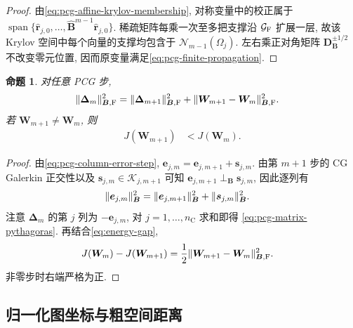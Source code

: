 \documentclass{ctexart}
\DeclarePairedDelimiter\norm{\lVert}{\rVert}
\newtheorem{proposition}[theorem]{命题}
\begin{document}
\begin{proof}
由\cref{eq:pcg-affine-krylov-membership}, 对称变量中的校正属于
$\operatorname{span}\{\widehat{\bm r}_{j,0},\ldots,
\widehat{\bm B}^{m-1}\widehat{\bm r}_{j,0}\}$.
稀疏矩阵每乘一次至多把支撑沿 $\mathcal G_{\rm F}$ 扩展一层, 故该 Krylov 空间中每个向量的支撑均包含于
$\mathcal N_{m-1}(\Omega_j)$. 左右乘正对角矩阵
$\bm D_{\bm B}^{\pm1/2}$ 不改变零元位置, 因而原变量满足\cref{eq:pcg-finite-propagation}.
\end{proof}

\begin{proposition}
\label{prop:pcg-exact-identities}
对任意 PCG 步,
\begin{align}
    \norm{\bm\Delta_m}_{\bm B,\mathrm{F}}^2
    &=
    \norm{\bm\Delta_{m+1}}_{\bm B,\mathrm{F}}^2
    +\norm{\bm W_{m+1}-\bm W_m}_{\bm B,\mathrm{F}}^2.
    \label{eq:pcg-matrix-pythagoras}
\end{align}
若 $\bm W_{m+1}\ne\bm W_m$, 则
\begin{align}
    J(\bm W_{m+1})&<J(\bm W_m).
    \label{eq:pcg-energy-strict-decrease}
\end{align}
\end{proposition}

\begin{proof}
由\cref{eq:pcg-column-error-step},
$\bm e_{j,m}=\bm e_{j,m+1}+\bm s_{j,m}$.
由第 $m+1$ 步的 CG Galerkin 正交性以及 $\bm s_{j,m}\in\mathcal K_{j,m+1}$ 可知
$\bm e_{j,m+1}\perp_{\bm B}\bm s_{j,m}$,
因此逐列有
\begin{align}
    \norm{\bm e_{j,m}}_{\bm B}^2
    &=
    \norm{\bm e_{j,m+1}}_{\bm B}^2
    +\norm{\bm s_{j,m}}_{\bm B}^2.
    \label{eq:pcg-column-pythagoras}
\end{align}
注意 $\bm\Delta_m$ 的第 $j$ 列为 $-\bm e_{j,m}$,
对 $j=1,\ldots,n_{\mathrm C}$ 求和即得
\cref{eq:pcg-matrix-pythagoras}. 再结合\cref{eq:energy-gap},
\begin{align}
    J(\bm W_m)-J(\bm W_{m+1})
    &=
    \frac12
    \norm{\bm W_{m+1}-\bm W_m}_{\bm B,\mathrm F}^2.
    \label{eq:pcg-energy-decrease-explicit}
\end{align}
非零步时右端严格为正.
\end{proof}


\subsection{归一化图坐标与粗空间距离}
\label{sec:normalized-geometry}
\end{document}
